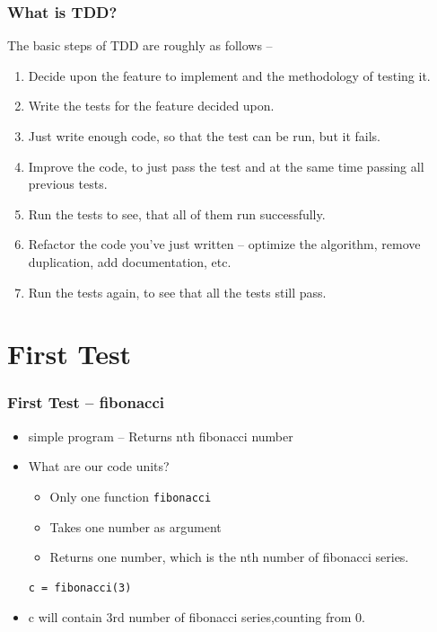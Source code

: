 \documentclass[12pt,presentation]{beamer}
\begin{document}

\begin{frame}
  \frametitle{What is TDD?}
  The basic steps of TDD are roughly as follows --
  \begin{enumerate}
  \item Decide upon the feature to implement and the methodology of
    testing it.
  \item Write the tests for the feature decided upon.
  \item Just write enough code, so that the test can be run, but it fails.
  \item Improve the code, to just pass the test and at the same time
    passing all previous tests.
  \item Run the tests to see, that all of them run successfully.
  \item Refactor the code you've just written -- optimize the algorithm,
    remove duplication, add documentation, etc.
  \item Run the tests again, to see that all the tests still pass.
  
  \end{enumerate}
\end{frame}
\section{First Test}

\begin{frame}[fragile]
  \frametitle{First Test -- fibonacci}
  \begin{itemize}
  \item simple program -- Returns nth fibonacci number
  \item What are our code units?
    \begin{itemize}
    \item Only one function \texttt{fibonacci}
    \item Takes one number as argument
    \item Returns one number, which is the nth number of fibonacci series.
    \end{itemize}
\begin{lstlisting}
c = fibonacci(3)
\end{lstlisting}
  \item c will contain 3rd number of fibonacci series,counting from 0.
  \end{itemize}
\end{frame}
\end{document}
